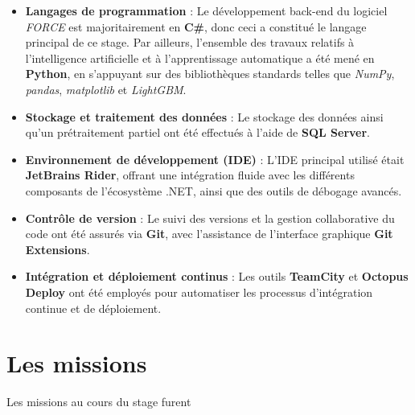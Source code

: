 \documentclass [twoside,openright,a4paper,11pt,french] {report}
\begin{document}
\begin{itemize}
    \item \textbf{Langages de programmation} : Le développement back-end du logiciel \textit{FORCE} est majoritairement en \textbf{C\#}, donc ceci a constitué 
    le langage principal de ce stage. Par ailleurs, l'ensemble des travaux relatifs à l'intelligence artificielle et à l'apprentissage automatique a été mené en \textbf{Python}, en s'appuyant 
    sur des bibliothèques standards telles que \textit{NumPy}, \textit{pandas}, \textit{matplotlib} et \textit{LightGBM}.
    
    \item \textbf{Stockage et traitement des données} : Le stockage des données ainsi qu'un prétraitement partiel ont été effectués à l'aide de \textbf{SQL Server}.
    
    \item \textbf{Environnement de développement (IDE)} : L'IDE principal utilisé était \textbf{JetBrains Rider}, offrant une intégration fluide avec les différents composants de l'écosystème .NET, ainsi que des outils de débogage avancés.
    
    \item \textbf{Contrôle de version} : Le suivi des versions et la gestion collaborative du code ont été assurés via \textbf{Git}, avec l'assistance de l'interface graphique \textbf{Git Extensions}.
    
    \item \textbf{Intégration et déploiement continus} : Les outils \textbf{TeamCity} et \textbf{Octopus Deploy} ont été employés pour automatiser les processus d'intégration continue et de déploiement.
\end{itemize}


\section {Les missions}

Les missions au cours du stage furent
\end{document}

